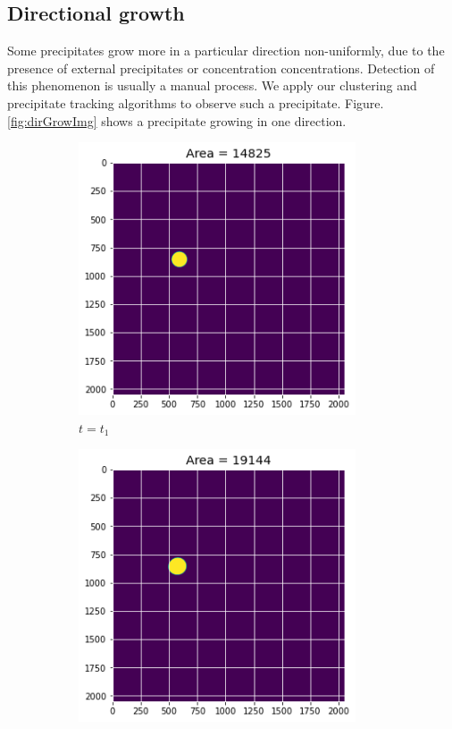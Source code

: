 \documentclass[12pt, a4paper]{report}
\begin{document}
\subsection{Directional growth}
\label{dirGro}
Some precipitates grow more in a particular direction non-uniformly, due to the presence of external precipitates or concentration concentrations. Detection of this phenomenon is usually a manual process. We apply our clustering and precipitate tracking algorithms to observe such a precipitate. Figure. \ref{fig:dirGrowImg} shows a precipitate growing in one direction. 

\begin{figure}[H]
\centering
\begin{subfigure}{.45\textwidth}
  \centering
  \includegraphics[width=0.9\textwidth]{Pictures/Growth/1.1.jpeg}
  \caption{$t = t_1$}
  \label{img:microstrImg}
\end{subfigure}
\begin{subfigure}{.45\textwidth}
  \centering
  \includegraphics[width=0.9\textwidth]{Pictures/Growth/1.2.jpeg}

\end{subfigure}
\end{figure}
\end{document}
